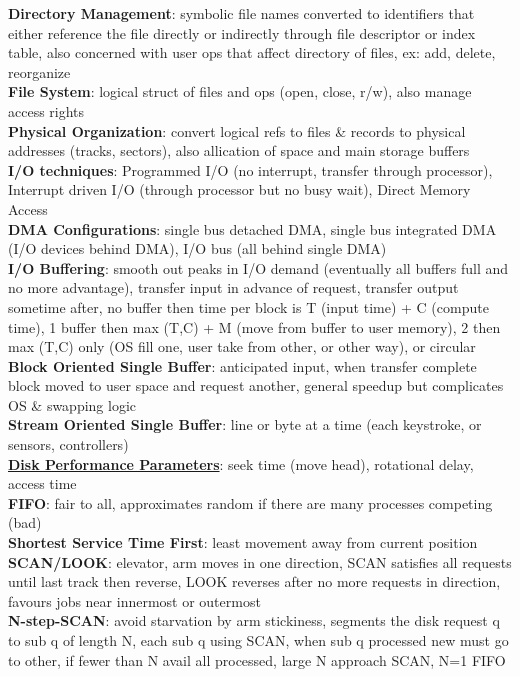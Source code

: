 \documentclass[a4paper]{article}
\begin{document}
\begin{multicols}{2}
        \textbf{Directory Management}: symbolic file names converted to identifiers that either reference the file directly or indirectly through file descriptor or index table, also concerned with user ops that affect directory of files, ex: add, delete, reorganize\\
        \textbf{File System}: logical struct of files and ops (open, close, r/w), also manage access rights\\
        \textbf{Physical Organization}: convert logical refs to files \& records to physical addresses (tracks, sectors), also allication of space and main storage buffers\\
        \textbf{I/O techniques}: Programmed I/O (no interrupt, transfer through processor), Interrupt driven I/O (through processor but no busy wait), Direct Memory Access\\
        \textbf{DMA Configurations}: single bus detached DMA, single bus integrated DMA (I/O devices behind DMA), I/O bus (all behind single DMA)\\
        \textbf{I/O Buffering}: smooth out peaks in I/O demand (eventually all buffers full and no more advantage), transfer input in advance of request, transfer output sometime after, no buffer then time per block is T (input time) + C (compute time), 1 buffer then max (T,C) + M (move from buffer to user memory), 2 then max (T,C) only (OS fill one, user take from other, or other way), or circular\\
        \textbf{Block Oriented Single Buffer}: anticipated input, when transfer complete block moved to user space and request another, general speedup but complicates OS \& swapping logic\\
        \textbf{Stream Oriented Single Buffer}: line or byte at a time (each keystroke, or sensors, controllers)\\
        \underline{\textbf{Disk Performance Parameters}}: seek time (move head), rotational delay, access time\\
        \textbf{FIFO}: fair to all, approximates random if there are many processes competing (bad)\\
        \textbf{Shortest Service Time First}: least movement away from current position\\
        \textbf{SCAN/LOOK}: elevator, arm moves in one direction, SCAN satisfies all requests until last track then reverse, LOOK reverses after no more requests in direction, favours jobs near innermost or outermost\\
        \textbf{N-step-SCAN}: avoid starvation by arm stickiness, segments the disk request q to sub q of length N, each sub q using SCAN, when sub q processed new must go to other, if fewer than N avail all processed, large N approach SCAN, N=1 FIFO\\

\end{multicols}
\end{document}
